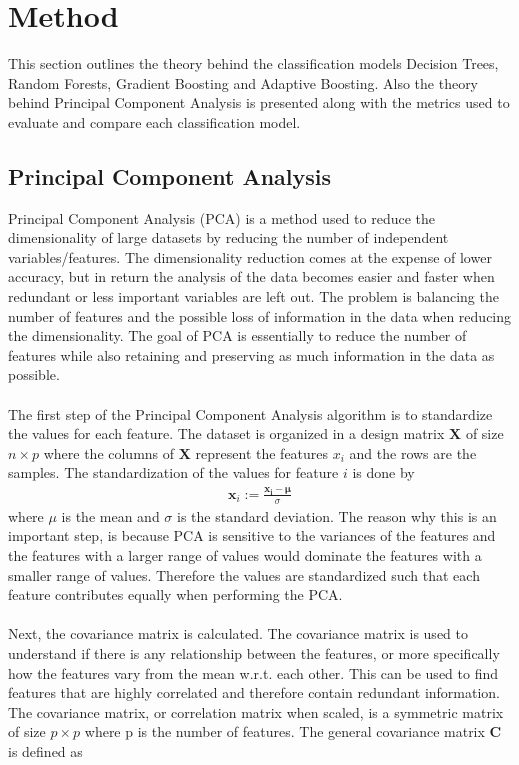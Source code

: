 \documentclass[a4paper,twocolumn]{article}
\newcommand{\X}{\mathbf{X}}
\begin{document}
\section{Method}
This section outlines the theory behind the classification models Decision Trees, Random Forests, Gradient Boosting and Adaptive Boosting. Also the theory behind Principal Component Analysis is presented along with the metrics used to evaluate and compare each classification model.
\subsection{Principal Component Analysis}
Principal Component Analysis (PCA) is a method used to reduce the dimensionality of large datasets by reducing the number of independent variables/features. The dimensionality reduction comes at the expense of lower accuracy, but in return the analysis of the data becomes easier and faster when redundant or less important variables are left out. The problem is balancing the number of features and the possible loss of information in the data when reducing the dimensionality. The goal of PCA is essentially to reduce the number of features while also retaining and preserving as much information in the data as possible.\\
\\
The first step of the Principal Component Analysis algorithm is to standardize the values for each feature. The dataset is organized in a design matrix $\X$ of size $n \times p$ where the columns of $\X$ represent the features $x_{i}$ and the rows are the samples. The standardization of the values for feature $i$ is done by
\begin{align}
    \mathbf{x}_{i} := \frac{\mathbf{x_{i} - \mu}}{\sigma}
\end{align}
where $\mu$ is the mean and $\sigma$ is the standard deviation. The reason why this is an important step, is because PCA is sensitive to the variances of the features and the features with a larger range of values would dominate the features with a smaller range of values. Therefore the values are standardized such that each feature contributes equally when performing the PCA.\\
\\
Next, the covariance matrix is calculated. The covariance matrix is used to understand if there is any relationship between the features, or more specifically how the features vary from the mean w.r.t. each other. This can be used to find features that are highly correlated and therefore contain redundant information. The covariance matrix, or correlation matrix when scaled, is a symmetric matrix of size $p \times p$ where p is the number of features. The general covariance matrix $\mathbf{C}$ is defined as
\end{document}
